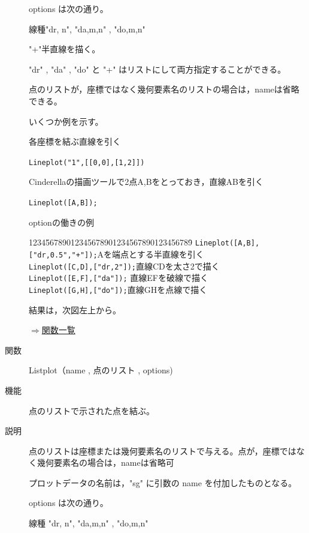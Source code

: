 \documentclass[papersize,a4paper,12pt,uplatex]{jsarticle}
\begin{document}
\begin{description}
options は次の通り。

線種"dr, n", "da,m,n" , "do,m,n"

 "+"半直線を描く。

"dr" , "da" , "do" と "+" はリストにして両方指定することができる。

点のリストが，座標ではなく幾何要素名のリストの場合は，nameは省略できる。

いくつか例を示す。

\vspace{\baselineskip}
各座標を結ぶ直線を引く

\hspace{5mm} \verb|Lineplot("1",[[0,0],[1,2]])|

Cinderellaの描画ツールで2点A,Bをとっておき，直線ABを引く

\hspace{5mm} \verb|Lineplot([A,B]);| 

optionの働きの例
\begin{tabbing}
1234\=56789012345678901234567890123456789\=\kill
 \> \verb|Lineplot([A,B],["dr,0.5","+"]);|\>Aを端点とする半直線を引く\\
 \> \verb|Lineplot([C,D],["dr,2"]);|\>直線CDを太さ2で描く\\
 \> \verb|Lineplot([E,F],["da"]);| \>直線EFを破線で描く\\
 \> \verb|Lineplot([G,H],["do"]);|\>直線GHを点線で描く
\end{tabbing}
結果は，次図左上から。

\vspace{\baselineskip}
\hspace{20mm} 

\begin{flushright}\hyperlink{functionlist}{$\Rightarrow$関数一覧}\end{flushright}

\vspace{\baselineskip}
\hypertarget{listplot}{}
\item[関数]Listplot（name , 点のリスト , options)
\item[機能]点のリストで示された点を結ぶ。
\item[説明]点のリストは座標または幾何要素名のリストで与える。点が，座標ではなく幾何要素名の場合は，nameは省略可 

プロットデータの名前は，"sg" に引数の name を付加したものとなる。

 options は次の通り。

線種 "dr, n", "da,m,n" , "do,m,n"


\end{description}
\end{document}
